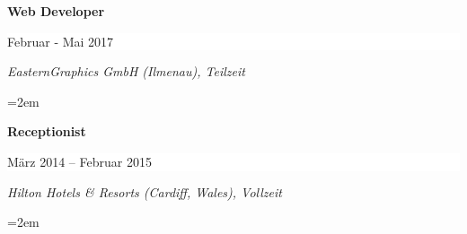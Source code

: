 \documentclass[paper=a4,fontsize=10.47pt]{scrartcl} %
\newcommand{\sepspace}{\vspace*{0.5em}}		%
\newcommand{\EducationEntry}[4]{
		\noindent \textbf{#1} \hfill      %
		\colorbox{White}{%
			\parbox{16em}{%
			\hfill\color{Black}#2}} \par  %
		\noindent \textit{#3} \par        %
		\noindent\hangindent=2em\hangafter=0 \small #4 %
		\normalsize \par}
\begin{document}
\sepspace
\EducationEntry{\color[HTML]{6a040f}Web Developer}{Februar - Mai 2017}{EasternGraphics GmbH (Ilmenau), Teilzeit}{%
}














\sepspace
\EducationEntry{\color[HTML]{6a040f}Receptionist}{März 2014 – Februar 2015}{Hilton Hotels \& Resorts (Cardiff, Wales), Vollzeit}{%
}
\end{document}
